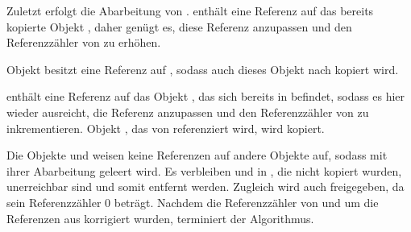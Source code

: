 Zuletzt erfolgt die Abarbeitung von .
 enthält eine Referenz auf das bereits kopierte Objekt , daher genügt es, diese Referenz anzupassen und den Referenzzähler von  zu erhöhen.

\begin{center}
	
\end{center}

Objekt  besitzt eine Referenz auf , sodass auch dieses Objekt nach \Mature kopiert wird.

\begin{center}
	
\end{center}

 enthält eine Referenz auf das Objekt , das sich bereits in \Mature befindet, sodass es hier wieder ausreicht, die Referenz anzupassen und den Referenzzähler von  zu inkrementieren.
Objekt , das von  referenziert wird, wird kopiert.

\begin{center}
	
\end{center}

Die Objekte  und  weisen keine Referenzen auf andere Objekte auf, sodass mit ihrer Abarbeitung  geleert wird.
Es verbleiben  und  in \Nursery, die nicht kopiert wurden, unerreichbar sind und somit entfernt werden.
Zugleich wird auch  freigegeben, da sein Referenzzähler $0$ beträgt.
Nachdem die Referenzzähler von  und  um die Referenzen aus \Roots korrigiert wurden, terminiert der Algorithmus.

\begin{center}
	
\end{center}